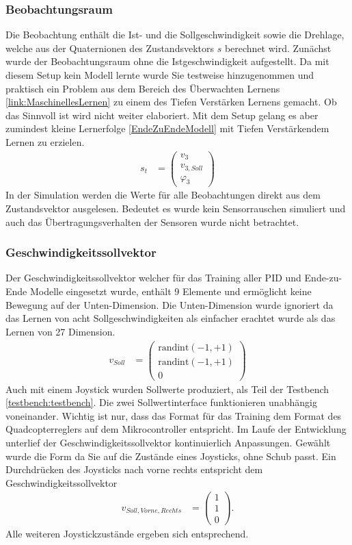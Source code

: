 \subsubsection{Beobachtungsraum}
Die Beobachtung enthält die Ist- und die Sollgeschwindigkeit sowie die Drehlage, welche aus der Quaternionen des Zustandsvektors $s$ berechnet wird. Zunächst wurde der Beobachtungsraum ohne die Istgeschwindigkeit aufgestellt. Da mit diesem Setup kein Modell lernte wurde Sie testweise hinzugenommen und praktisch ein Problem aus dem Bereich des Überwachten Lernens \ref{link:MaschinellesLernen} zu einem des Tiefen Verstärken Lernens gemacht. Ob das Sinnvoll ist wird nicht weiter elaboriert. Mit dem Setup gelang es aber zumindest kleine Lernerfolge \ref{EndeZuEndeModell} mit Tiefen Verstärkendem Lernen zu erzielen.
\begin{align}
	s_t &= \begin{pmatrix}
		v_3\\
		v_{3, Soll}\\
		\varphi_3
	\end{pmatrix}
\end{align}
In der Simulation werden die Werte für alle Beobachtungen direkt aus dem Zustandsvektor ausgelesen. Bedeutet es wurde kein Sensorrauschen simuliert und auch das Übertragungsverhalten der Sensoren wurde nicht betrachtet. 

\subsubsection{\label{Geschwindigkeitssollvektor}Geschwindigkeitssollvektor}
Der Geschwindigkeitssollvektor welcher für das Training aller PID und Ende-zu-Ende Modelle eingesetzt wurde, enthält 9 Elemente und ermöglicht keine Bewegung auf der Unten-Dimension. Die Unten-Dimension wurde ignoriert da das Lernen von acht Sollgeschwindigkeiten als einfacher erachtet wurde als das Lernen von 27 Dimension.
\begin{align}
	v_{Soll} &= \begin{pmatrix}
		\text{randint}(-1, +1)\\
		\text{randint}(-1, +1)\\
		0
	\end{pmatrix}
\end{align}
Auch mit einem Joystick wurden Sollwerte produziert, als Teil der Testbench \ref{testbench:testbench}. Die zwei Sollwertinterface funktionieren unabhängig voneinander. Wichtig ist nur, dass das Format für das Training dem Format des Quadcopterreglers auf dem Mikrocontroller entspricht.
Im Laufe der Entwicklung unterlief der Geschwindigkeitssollvektor kontinuierlich Anpassungen. Gewählt wurde die Form da Sie auf die Zustände eines Joysticks, ohne Schub passt. Ein Durchdrücken des Joysticks nach vorne rechts entspricht dem Geschwindigkeitssollvektor
\begin{align}
	v_{Soll,Vorne,Rechts} &= \begin{pmatrix}
		1\\
		1\\
		0
	\end{pmatrix}.
\end{align}
Alle weiteren Joystickzustände ergeben sich entsprechend. 

